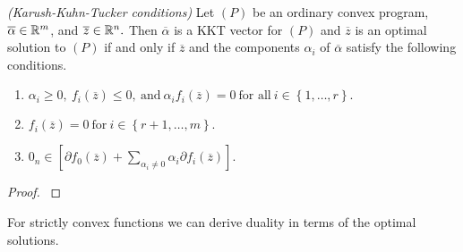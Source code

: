 \begin{ftheorem}
  \emph{(Karush-Kuhn-Tucker conditions)}
  Let $(P)$
  be an ordinary convex program,
  $
  \overline{\alpha}
  \in \mathbb{R}^m
  $,
   and 
   $
   \overline{z}
   \in \mathbb{R}^n.
   $
   Then 
   $
  \overline{\alpha}
   $
   is a KKT vector for $(P)$
   and 
   $
   \overline{z}
   $
   is an optimal solution to $(P)$
   if and only if 
   $
   \overline{z}
   $
   and 
   the components $\alpha_i$ of
   $
  \overline{\alpha}
   $
   satisfy 
   the following conditions.

  \begin{enumerate}[label={(\roman*)}]
    \item
      $
        \alpha_i \ge 0,
        \ 
        f_i(
   \overline{z}
        )
        \le 0,
        \ 
        \text{and}
        \ 
        \alpha_i 
        f_i(
   \overline{z}
        )
        =0
        \ 
        \text{for all}
        \ 
        i\in \left\{ 1, \ldots, r \right\}
        .
      $
      \item
        $
        f_i(
   \overline{z}
        )
        =0
        \ 
        \text{for}
        \ 
        i\in \left\{ r+1, \ldots, m \right\}
        .
        $
      \item
        $
         0
         _n
         \in 
         [
          \partial
        f_0(
   \overline{z}
        )
        +
        \sum_{\alpha_i\neq 0}
        \alpha_i 
        \partial
        f_i(
   \overline{z}
        )
         ]
.
        $
  \end{enumerate}
\end{ftheorem}
\begin{proof}
  \cite[Theorem~28.3]{Rockafellar1970}
\end{proof}

\begin{takeaways}
  For strictly convex functions we can derive duality in terms of the optimal solutions.
\end{takeaways}
